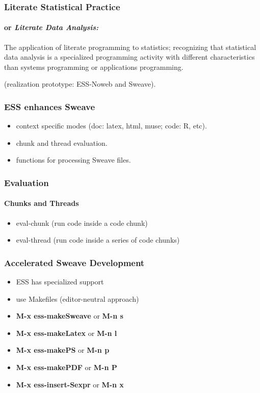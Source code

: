 \documentclass{beamer}
\begin{document}
\begin{frame} \frametitle{Literate Statistical Practice}
  \framesubtitle{or \emph{Literate Data Analysis:}}
  The application of literate programming to statistics; recognizing
  that statistical data analysis is a specialized programming activity
  with different characteristics than systems programming or
  applications programming.

  (realization prototype: ESS-Noweb and Sweave).
\end{frame}

\begin{frame} \frametitle{ESS enhances Sweave}
  \begin{itemize}
  \item context specific modes (doc: latex, html, muse; code: R, etc).
  \item chunk and thread evaluation.
  \item functions for processing Sweave files.
  \end{itemize}
\end{frame}

\begin{frame}
  \frametitle{Evaluation}
  \framesubtitle{Chunks and Threads}
  \begin{itemize}
  \item eval-chunk (run code inside a code chunk)
  \item eval-thread (run code inside a series of code chunks)
  \end{itemize}
\end{frame}

\begin{frame}
  \frametitle{Accelerated Sweave Development }
  \begin{itemize}
  \item ESS has specialized support
  \item use Makefiles (editor-neutral approach)
  \item \textbf{M-x ess-makeSweave}    or \textbf{M-n s}
  \item \textbf{M-x ess-makeLatex}     or \textbf{M-n l}
  \item \textbf{M-x ess-makePS}        or \textbf{M-n p}  
  \item \textbf{M-x ess-makePDF}       or \textbf{M-n P}
  \item \textbf{M-x ess-insert-Sexpr}  or \textbf{M-n x}
  \end{itemize}
\end{frame}
\end{document}
